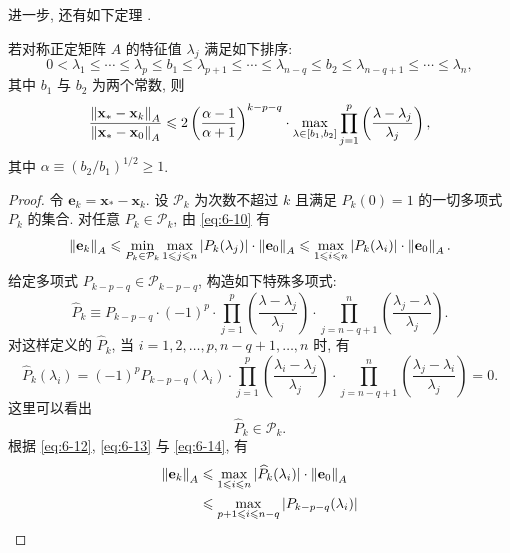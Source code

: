 进一步, 还有如下定理 \cite{src:43}.

\begin{theorem}
\label{thm:6-7}
若对称正定矩阵 $A$ 的特征值 $\lambda_j$ 满足如下排序:
\[
  0<\lambda_1\leqslant\cdots\leqslant\lambda_p\leqslant b_1
  \leqslant\lambda_{p+1}\leqslant\cdots\leqslant\lambda_{n-q}\leqslant b_2
  \leqslant\lambda_{n-q+1}\leqslant\cdots\leqslant\lambda_n,
\]
其中 $b_1$ 与 $b_2$ 为两个常数, 则
\[
  \frac{\left\|\mathbf{x}_*-\mathbf{x}_k\right\|_A}{\left\|\mathbf{x}_*-\mathbf{x}_0\right\|_A}
  \leqslant2\left(\frac{\alpha-1}{\alpha+1}\right)^{k-p-q}
  \cdot\max_{\lambda\in[b_1,b_2]}\prod_{j=1}^p
  \left(\frac{\lambda-\lambda_j}{\lambda_j}\right),
\]
其中 $\alpha\equiv(b_2/b_1)^{1/2}\geqslant1$.
\end{theorem}

\begin{proof}
令 $\mathbf{e}_k=\mathbf{x}_*-\mathbf{x}_k$. 设 $\mathcal{P}_k$ 为次数不超过 $k$ 且满足 $P_k(0)=1$ 的一切多项式 $P_k$ 的集合. 对任意 $P_k\in\mathcal{P}_k$, 由 \eqref{eq:6-10} 有
\begin{equation}
  \left\|\mathbf{e}_k\right\|_A
  \leqslant\min_{P_k\in\mathcal{P}_k}\max_{1\leqslant j\leqslant n}
  |P_k(\lambda_j)|\cdot\left\|\mathbf{e}_0\right\|_A
  \leqslant\max_{1\leqslant i\leqslant n}|P_k(\lambda_i)|
  \cdot\left\|\mathbf{e}_0\right\|_A.
  \label{eq:6-12}
\end{equation}
给定多项式 $P_{k-p-q}\in\mathcal{P}_{k-p-q}$, 构造如下特殊多项式:
\[
  \widehat{P}_k\equiv P_{k-p-q}\cdot(-1)^p
  \cdot\prod_{j=1}^p\left(\frac{\lambda-\lambda_j}{\lambda_j}\right)
  \cdot\prod_{j=n-q+1}^n\left(\frac{\lambda_j-\lambda}{\lambda_j}\right).
\]
对这样定义的 $\widehat{P}_k$, 当 $i=1,2,\ldots,p,n-q+1,\ldots,n$ 时, 有
\begin{equation}
  \widehat{P}_k(\lambda_i)=(-1)^pP_{k-p-q}(\lambda_i)
  \cdot\prod_{j=1}^p\left(\frac{\lambda_i-\lambda_j}{\lambda_j}\right)
  \cdot\prod_{j=n-q+1}^n\left(\frac{\lambda_j-\lambda_i}{\lambda_j}\right)=0.
  \label{eq:6-13}
\end{equation}
这里可以看出
\begin{equation}
  \widehat{P}_k\in\mathcal{P}_k.
  \label{eq:6-14}
\end{equation}
根据 \eqref{eq:6-12}, \eqref{eq:6-13} 与 \eqref{eq:6-14}, 有
\[
  \begin{aligned}
    \norm{\mathbf{e}_k}_A
    &\leqslant\max_{1\leqslant i\leqslant n}|\widehat{P}_k(\lambda_i)|
      \cdot\norm{\mathbf{e}_0}_A\\
    &\leqslant\max_{p+1\leqslant i\leqslant n-q}
      \left|P_{k-p-q}(\lambda_i)\right|

\end{aligned}\]
\end{proof}
